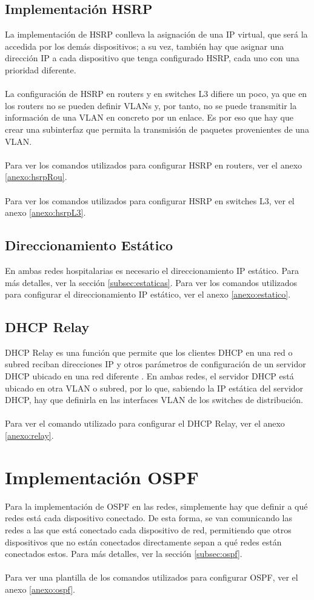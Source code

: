 \subsection{Implementación HSRP}
La implementación de HSRP conlleva la asignación de una IP virtual, que será la accedida por los demás dispositivos; a su vez, también hay que asignar una dirección IP a cada dispositivo que tenga configurado HSRP, cada uno con una prioridad diferente.
\\ \\
La configuración de HSRP en routers y en switches L3 difiere un poco, ya que en los routers no se pueden definir VLANs y, por tanto, no se puede transmitir la información de una VLAN en concreto por un enlace. Es por eso que hay que crear una subinterfaz que permita la transmisión de paquetes provenientes de una VLAN.
\\ \\
Para ver los comandos utilizados para configurar HSRP en routers, ver el anexo \ref{anexo:hsrpRou}.
\\ \\
Para ver los comandos utilizados para configurar HSRP en switches L3, ver el anexo \ref{anexo:hsrpL3}.
\subsection{Direccionamiento Estático}
En ambas redes hospitalarias es necesario el direccionamiento IP estático. Para más detalles, ver la sección \ref{subsec:estaticas}. Para ver los comandos utilizados para configurar el direccionamiento IP estático, ver el anexo \ref{anexo:estatico}.
\subsection{DHCP Relay}
DHCP Relay es una función que permite que los clientes DHCP en una red o subred reciban direcciones IP y otros parámetros de configuración de un servidor DHCP ubicado en una red diferente \cite{cisco_dhcp_relay}. En ambas redes, el servidor DHCP está ubicado en otra VLAN o subred, por lo que, sabiendo la IP estática del servidor DHCP, hay que definirla en las interfaces VLAN de los switches de distribución. 
\\ \\
Para ver el comando utilizado para configurar el DHCP Relay, ver el anexo \ref{anexo:relay}.

\section{Implementación OSPF}
Para la implementación de OSPF en las redes, simplemente hay que definir a qué redes está cada dispositivo conectado. De esta forma, se van comunicando las redes a las que está conectado cada dispositivo de red, permitiendo que otros dispositivos que no están conectados directamente sepan a qué redes están conectados estos. Para más detalles, ver la sección \ref{subsec:ospf}.
\\ \\
Para ver una plantilla de los comandos utilizados para configurar OSPF, ver el anexo \ref{anexo:ospf}.


